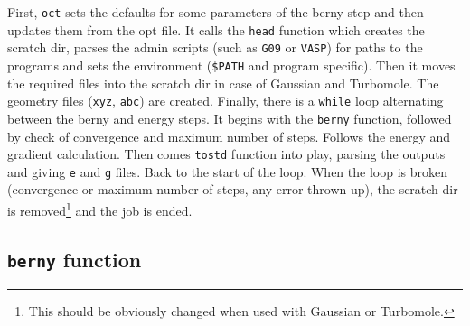 \documentclass[12pt,a4]{article}
\begin{document}
First, \texttt{oct} sets the defaults for some parameters of the berny step and then updates them from the opt file. It calls the \texttt{head} function which creates the scratch dir, parses the admin scripts (such as \texttt{G09} or \texttt{VASP}) for paths to the programs and sets the environment (\texttt{\$PATH} and program specific). Then it moves the required files into the scratch dir in case of Gaussian and Turbomole. The geometry files (\texttt{xyz}, \texttt{abc}) are created. Finally, there is a \texttt{while} loop alternating between the berny and energy steps. It begins with the \texttt{berny} function, followed by check of convergence and maximum number of steps. Follows the energy and gradient calculation. Then comes \texttt{tostd} function into play, parsing the outputs and giving \texttt{e} and \texttt{g} files. Back to the start of the loop. When the loop is broken (convergence or maximum number of steps, any error thrown up), the scratch dir is removed\footnote{This should be obviously changed when used with Gaussian or Turbomole.} and the job is ended.

\subsection{\texttt{berny} function}
\end{document}
